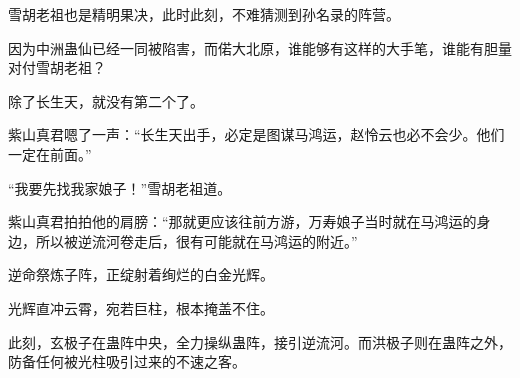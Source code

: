 \begin{this_body}
雪胡老祖也是精明果决，此时此刻，不难猜测到孙名录的阵营。

因为中洲蛊仙已经一同被陷害，而偌大北原，谁能够有这样的大手笔，谁能有胆量对付雪胡老祖？

除了长生天，就没有第二个了。

紫山真君嗯了一声：“长生天出手，必定是图谋马鸿运，赵怜云也必不会少。他们一定在前面。”

“我要先找我家娘子！”雪胡老祖道。

紫山真君拍拍他的肩膀：“那就更应该往前方游，万寿娘子当时就在马鸿运的身边，所以被逆流河卷走后，很有可能就在马鸿运的附近。”

逆命祭炼子阵，正绽射着绚烂的白金光辉。

光辉直冲云霄，宛若巨柱，根本掩盖不住。

此刻，玄极子在蛊阵中央，全力操纵蛊阵，接引逆流河。而洪极子则在蛊阵之外，防备任何被光柱吸引过来的不速之客。

\end{this_body}

